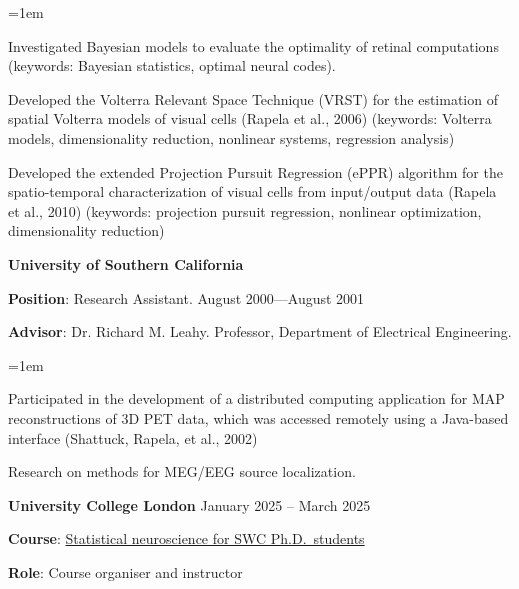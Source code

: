 \documentclass{article}
\begin{document}
\begin{list}{}{\leftmargin=1em}
\item Investigated Bayesian models to evaluate the optimality of retinal computations (keywords: Bayesian statistics, optimal neural codes).
\item Developed the Volterra Relevant Space Technique (VRST) for the
estimation of spatial Volterra models of visual cells (Rapela et al., 2006) (keywords: Volterra models, dimensionality reduction, nonlinear systems, regression analysis)
\item Developed the extended Projection Pursuit Regression (ePPR) algorithm
for the spatio-temporal characterization of visual cells from input/output
data (Rapela et al., 2010) (keywords: projection pursuit regression, nonlinear
optimization, dimensionality reduction)

\end{list}

\par
\vspace{.1in}
{\bf University of Southern California}
\par
{\bf Position}: Research Assistant. \hspace*{\fill} August 2000---August 2001
\par
{\bf Advisor}: Dr. Richard M. Leahy. Professor, Department of Electrical
Engineering.

\begin{list}{}{\leftmargin=1em}

\item Participated in the development of a distributed computing application
for MAP reconstructions of 3D PET data, which was accessed remotely using a
Java-based interface (Shattuck, Rapela, et al., 2002)

\item Research on methods for MEG/EEG source localization.
\end{list}

\par
\vspace{2\baselineskip}
{\bf University College London} \hspace*{\fill} January 2025 -- March 2025
\par
{\bf Course}:
\href{https://github.com/joacorapela/statNeuro2025}{Statistical neuroscience for SWC Ph.D.\ students}
\par
{\bf Role}: Course organiser and instructor
\end{document}
